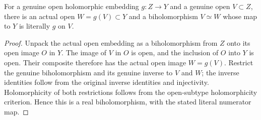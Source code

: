 \begin{lemma}
\label{hir:nc-open-image-actual-equivalence}
\leanok
For a genuine open holomorphic embedding $g:Z\to Y$ and a genuine open
$V\subset Z$, there is an actual open $W=g(V)\subset Y$ and a
biholomorphism $V\simeq W$ whose map to $Y$ is literally $g$ on $V$.
\end{lemma}
\begin{proof}
Unpack the actual open embedding as a biholomorphism from $Z$ onto its
open image $O$ in $Y$. The image of $V$ in $O$ is open, and the inclusion
of $O$ into $Y$ is open. Their composite therefore has the actual open
image $W=g(V)$. Restrict the genuine biholomorphism and its genuine
inverse to $V$ and $W$; the inverse identities follow from the original
inverse identities and injectivity. Holomorphicity of both restrictions
follows from the open-subtype holomorphicity criterion. Hence this is a
real biholomorphism, with the stated literal numerator map.
\end{proof}

